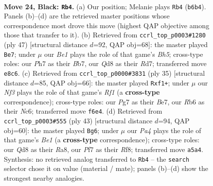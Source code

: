 \documentclass[11pt]{article}
\begin{document}
\clearpage

\begin{figure}[p]\centering
\begin{subfigure}{0.46\textwidth}\centering
\resizebox{\linewidth}{!}{%
\newchessgame
\chessboard[
  setfen={r2qb1k1/p4ppp/1r3n2/p2pN3/3Q2PP/1P1B4/P4P2/R3R1K1 b - - 4 24},
  showmover=false,
  pgfstyle=straightmove, color=movearrow, markmove={b6-b4}
]}
\caption{}
\end{subfigure}\hfill
\begin{subfigure}{0.46\textwidth}\centering
\resizebox{\linewidth}{!}{%
\newchessgame
\chessboard[
  setfen={2k5/1b1r1p2/p1p1p2p/q1npP3/3Q1P1b/2N5/PRP3BK/1R6 b - - 3 24},
  showmover=false,
  pgfstyle=straightmove, color=movearrow, markmove={h4-e7}
]}
\caption{}
\end{subfigure}
\\[4pt]
\begin{subfigure}{0.46\textwidth}\centering
\resizebox{\linewidth}{!}{%
\newchessgame
\chessboard[
  setfen={4rr1k/pppqb1pp/2np4/3Q4/3PN3/8/PPPB2PP/4RRK1 b - - 7 18},
  showmover=false,
  pgfstyle=straightmove, color=movearrow, markmove={f8-f1}
]}
\caption{}
\end{subfigure}\hfill
\begin{subfigure}{0.46\textwidth}\centering
\resizebox{\linewidth}{!}{%
\newchessgame
\chessboard[
  setfen={r3brk1/pp4pp/3qpn2/3p4/3Q1P2/P1NB4/1PP3PP/R4R1K b - - 3 22},
  showmover=false,
  pgfstyle=straightmove, color=movearrow, markmove={e8-g6}
]}
\caption{}
\end{subfigure}
\caption{\textbf{Move 24, Black: \texttt{Rb4}.} (a) Our position; Melanie plays \texttt{Rb4} (\texttt{b6b4}). Panels (b)--(d) are the retrieved master positions whose correspondence most drove this move (highest QAP objective among those that transfer to it). (b) Retrieved from \texttt{ccrl\_top\_p0003\#1280} (ply 47) [structural distance $d$=92, QAP obj=68]: the master played \texttt{Be7}; under $\mu$ our \emph{Be1} plays the role of that game's \emph{Bh5}; cross-type roles: our \emph{P}h7 as their \emph{B}b7, our \emph{Q}d8 as their \emph{R}d7; transferred move \texttt{e8c6}. (c) Retrieved from \texttt{ccrl\_top\_p0000\#3831} (ply 35) [structural distance $d$=85, QAP obj=66]: the master played \texttt{Rxf1+}; under $\mu$ our \emph{Nf3} plays the role of that game's \emph{Rf1} (a \textbf{cross-type} correspondence); cross-type roles: our \emph{P}g7 as their \emph{B}e7, our \emph{R}b6 as their \emph{N}c6; transferred move \texttt{f6e4}. (d) Retrieved from \texttt{ccrl\_top\_p0003\#555} (ply 43) [structural distance $d$=94, QAP obj=60]: the master played \texttt{Bg6}; under $\mu$ our \emph{Pa4} plays the role of that game's \emph{Be1} (a \textbf{cross-type} correspondence); cross-type roles: our \emph{Q}d8 as their \emph{R}a8, our \emph{P}f7 as their \emph{R}f8; transferred move \texttt{a5a4}. Synthesis: no retrieved analog transferred to \texttt{Rb4} -- the \texttt{search} selector chose it on value (material / mate); panels (b)--(d) show the strongest nearby analogies.}
\label{fig:thought-m47}
\end{figure}
\end{document}
